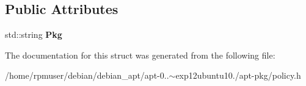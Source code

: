 \subsection*{\-Public \-Attributes}
\begin{DoxyCompactItemize}
\item 
std\-::string {\bfseries \-Pkg}\label{structpkgPolicy_1_1PkgPin_ab685b6dba76ce454949bd3674467fd2a}

\end{DoxyCompactItemize}


\-The documentation for this struct was generated from the following file\-:\begin{DoxyCompactItemize}
\item 
/home/rpmuser/debian/debian\-\_\-apt/apt-\/0..$\sim$exp12ubuntu10./apt-\/pkg/policy.\-h\end{DoxyCompactItemize}
